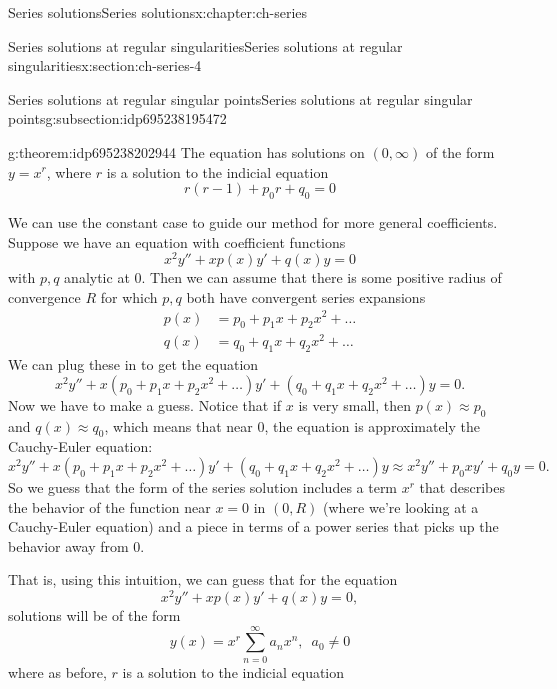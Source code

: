 \documentclass[oneside,10pt,]{book}
\numberwithin{equation}{section}
\numberwithin{equation}{section}
\newcommand{\amp}{&}
\begin{document}
\begin{chapterptx}{Series solutions}{}{Series solutions}{}{}{x:chapter:ch-series}
\begin{sectionptx}{Series solutions at regular singularities}{}{Series solutions at regular singularities}{}{}{x:section:ch-series-4}
\begin{subsectionptx}{Series solutions at regular singular points}{}{Series solutions at regular singular points}{}{}{g:subsection:idp695238195472}
\begin{theorem}{}{}{g:theorem:idp695238202944}
The equation has solutions on \((0,\infty)\) of the form \(y = x^r\), where \(r\) is a solution to the indicial equation%
\begin{equation}
r(r-1) + p_0 r + q_0 = 0\label{x:men:eq-indicial}
\end{equation}
%
\end{theorem}
We can use the constant case to guide our method for more general coefficients. Suppose we have an equation with coefficient functions%
\begin{equation*}
x^2 y'' + xp(x)y' + q(x) y = 0
\end{equation*}
with \(p,q\) analytic at \(0\). Then we can assume that there is some positive radius of convergence \(R\) for which \(p, q\) both have convergent series expansions%
\begin{align*}
p(x) \amp= p_0 + p_1 x + p_2 x^2 + \ldots\\
q(x) \amp= q_0 + q_1 x + q_2 x^2 + \ldots
\end{align*}
We can plug these in to get the equation%
\begin{equation*}
x^2 y'' + x\left(p_0 + p_1 x + p_2 x^2 + \ldots\right)y' + \left(q_0 + q_1 x + q_2 x^2 + \ldots \right)y = 0.
\end{equation*}
Now we have to make a guess. Notice that if \(x\) is very small, then \(p(x) \approx p_0\) and \(q(x) \approx q_0\), which means that near 0, the equation is approximately the Cauchy-Euler equation:%
\begin{equation*}
x^2 y'' + x\left(p_0 + p_1 x + p_2 x^2 + \ldots\right)y' + \left(q_0 + q_1 x + q_2 x^2 + \ldots \right)y \approx x^2 y'' + p_0 x y' + q_0 y = 0.
\end{equation*}
So we guess that the form of the series solution includes a term \(x^r\) that describes the behavior of the function near \(x = 0\) in \((0,R)\) (where we're looking at a Cauchy-Euler equation) and a piece in terms of a power series that picks up the behavior away from \(0\).%
\par
That is, using this intuition, we can guess that for the equation%
\begin{equation*}
x^2 y'' +  x p(x) y' + q(x) y = 0,
\end{equation*}
solutions will be of the form%
\begin{equation}
y(x) = x^r \sum_{n=0}^\infty a_n x^n, \,\,\,a_0 \neq 0\label{x:men:eq-frob}
\end{equation}
where as before, \(r\) is a solution to the indicial equation%
\begin{equation*}

\end{equation*}
\end{subsectionptx}
\end{sectionptx}
\end{chapterptx}
\end{document}
